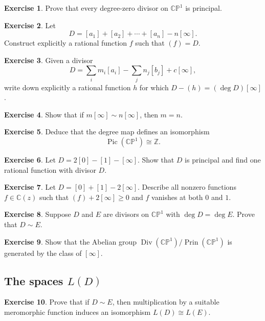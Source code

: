 \documentclass[11pt]{article}
\newcommand{\C}{\mathbb{C}}
\newcommand{\Z}{\mathbb{Z}}
\newcommand{\CP}{\mathbb{CP}}
\newcommand{\Div}{\operatorname{Div}}
\newcommand{\Pic}{\operatorname{Pic}}
\newcommand{\degd}{\operatorname{deg}}
\newcommand{\CPone}{\CP^1}
\theoremstyle{plain}
\theoremstyle{definition}
\newtheorem{exercise}{Exercise}
\begin{document}
\begin{exercise}
Prove that every degree-zero divisor on $\CPone$ is principal.
\end{exercise}

\begin{exercise}
Let
\[
D=[a_1]+[a_2]+\cdots+[a_n]-n[\infty].
\]
Construct explicitly a rational function $f$ such that $(f)=D$.
\end{exercise}

\begin{exercise}
Given a divisor
\[
D=\sum_i m_i[a_i]-\sum_j n_j[b_j]+c[\infty],
\]
write down explicitly a rational function $h$ for which $D-(h)=(\degd D)[\infty]$.
\end{exercise}

\begin{exercise}
Show that if $m[\infty]\sim n[\infty]$, then $m=n$.
\end{exercise}

\begin{exercise}
Deduce that the degree map defines an isomorphism
\[
\Pic(\CPone)\cong \Z.
\]
\end{exercise}

\begin{exercise}
Let $D=2[0]-[1]-[\infty]$. Show that $D$ is principal and find one rational function with divisor $D$.
\end{exercise}

\begin{exercise}
Let $D=[0]+[1]-2[\infty]$. Describe all nonzero functions $f\in\C(z)$ such that $(f)+2[\infty]\ge 0$ and $f$ vanishes at both $0$ and $1$.
\end{exercise}

\begin{exercise}
Suppose $D$ and $E$ are divisors on $\CPone$ with $\degd D=\degd E$. Prove that $D\sim E$.
\end{exercise}

\begin{exercise}
Show that the Abelian group $\Div(\CPone)/\operatorname{Prin}(\CPone)$ is generated by the class of $[\infty]$.
\end{exercise}

\subsection*{The spaces \texorpdfstring{$L(D)$}{L(D)}}
\begin{exercise}
Prove that if $D\sim E$, then multiplication by a suitable meromorphic function induces an isomorphism $L(D)\cong L(E)$.
\end{exercise}
\end{document}
